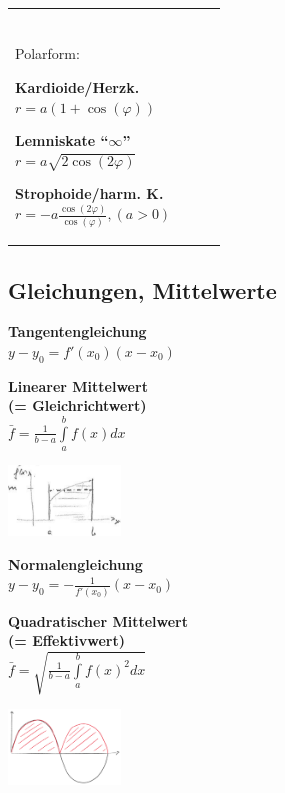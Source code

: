 \begin{tabular}{llll}
\parbox{2.7cm}{
\textbf{} \\
Polarform:
}

\parbox{5cm}{
\textbf{Kardioide/Herzk. } \\
$r = a(1+\cos(\varphi))$
}

\parbox{5cm}{
\textbf{Lemniskate ``$\infty$'' } \\
$r = a\sqrt{2\cos(2\varphi)}$ 
}

\parbox{5cm}{
\textbf{Strophoide/harm. K. } \\
$ r = -a \frac{\cos(2\varphi)}{\cos(\varphi)},(a>0) $ 
}

\end{tabular}
\newpage

\subsection{Gleichungen, Mittelwerte}

\begin{minipage}[t]{6cm}
  \textbf{Tangentengleichung}\\
    $y-y_0=f'(x_0)(x-x_0)$
\end{minipage}
\begin{minipage}[t]{5cm}
	\textbf{Linearer Mittelwert}\\
	\textbf{(= Gleichrichtwert)}\\
	$\bar{f} = \frac{1}{b-a} \int\limits_{a}^{b} f(x)dx$
\end{minipage}
\begin{minipage}{10cm}
    \includegraphics[width=3cm]{./bilder/linearer_mittelwert.png}
\end{minipage}
\newline
\vspace{1cm}
\newline
\begin{minipage}[t]{6cm}
  \textbf{Normalengleichung}\\
  $y-y_0=-\frac{1}{f'(x_0)}(x-x_0)$
\end{minipage}
\begin{minipage}[t]{5cm}
  \textbf{Quadratischer Mittelwert}\\
  \textbf{(= Effektivwert)}\\
  $\bar{f} = \sqrt{\frac{1}{b-a} \int\limits_{a}^{b} f(x)^2dx}$
\end{minipage}
\begin{minipage}{10cm}
	\includegraphics[width=3cm]{./bilder/quadratischer_mittelwert.png}
\end{minipage}
  
